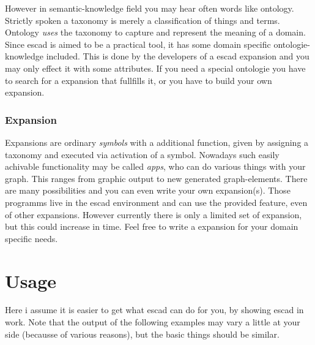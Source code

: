 \documentclass[a4paper, 12pt, openany]{scrbook}
\begin{document}
However in semantic-knowledge field you may hear often words like ontology. Strictly spoken a taxonomy is merely a classification of things and terms. Ontology \emph{uses} the taxonomy to capture and represent the meaning of a domain. Since escad is aimed to be a practical tool, it has some domain specific ontologie-knowledge included. This is done by the developers of a escad expansion and you may only effect it with some attributes. If you need a special ontologie you have to search for a expansion that fullfills it, or you have to build your own expansion.
\subsection{Expansion}
Expansions are ordinary \emph{symbols} with a additional function, given by assigning a taxonomy and executed via activation of a symbol. Nowadays such easily achivable functionality may be called \emph{apps}, who can do various things with your graph. This ranges from graphic output to new generated graph-elements. There are many possibilities and you can even write your own expansion(s). Those programms live in the escad environment and can use the provided feature, even of other expansions. However currently there is only a limited set of expansion, but this could increase in time. Feel free to write a expansion for your domain specific needs.
\chapter{Usage}
Here i assume it is easier to get what escad can do for you, by showing escad in work. Note that the output of the following examples may vary a little at your side (becausse of various reasons), but the basic things should be similar.
\end{document}
